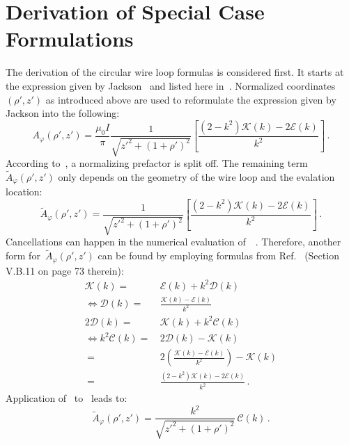 \section{Derivation of Special Case Formulations}
\label{apx:derivation_of_special_case_formulations}
The derivation of the circular wire loop formulas is considered first.
It starts at the expression given by Jackson~\cite{jackson}
and listed here in~.
Normalized coordinates~$(\rho', z')$ as introduced above
are used to reformulate the expression given by Jackson into the following:
\begin{equation}
 A_\varphi(\rho', z')
   = \frac{\mu_0 I}{\pi}
     \frac{1}{\sqrt{z'^2 + (1 + \rho')^2}}
     \left[ \frac{(2 - k^2)\mathcal{K}(k) - 2 \mathcal{E}(k)}{k^2} \right] \, . \label{eqn:cwl_A_phi_initial}
\end{equation}
According to~, a normalizing prefactor is split off.
The remaining term~$\tilde{A}_\varphi(\rho',z')$ only depends on the geometry of the wire loop
and the evalation location:
\begin{equation}
  \tilde{A}_\varphi(\rho', z')
  = \frac{1}{\sqrt{z'^2 + (1 + \rho')^2}}
    \left[ \frac{(2 - k^2)\mathcal{K}(k) - 2 \mathcal{E}(k)}{k^2} \right] \, . \label{eqn:aNormJackson}
\end{equation}
Cancellations can happen in the numerical evaluation of~~\cite{bulirsch_3}.
Therefore, another form for~$\tilde{A}_\varphi(\rho',z')$ can be found by employing
formulas from Ref.~\cite{jahnke_emde} (Section V.B.11 on page 73 therein):
\begin{align}
                 \mathcal{K}(k) =&\, \mathcal{E}(k) + k^2 \mathcal{D}(k) \nonumber \\
 \Leftrightarrow \mathcal{D}(k) =&\, \frac{\mathcal{K}(k) - \mathcal{E}(k)}{k^2} \\
               2 \mathcal{D}(k) =&\, \mathcal{K}(k) + k^2 \mathcal{C}(k) \nonumber \\
 \Leftrightarrow k^2 \mathcal{C}(k) =&\, 2 \mathcal{D}(k) - \mathcal{K}(k) \nonumber \\
                     ~              =&\, 2 \left( \frac{\mathcal{K}(k) - \mathcal{E}(k)}{k^2} \right) - \mathcal{K}(k) \nonumber \\
                     ~              =&\, \frac{(2 - k^2) \mathcal{K}(k) - 2 \mathcal{E}(k)}{k^2} \, . \label{eqn:kSqC}
\end{align}
Application of~ to~ leads to:
\begin{equation}
  \tilde{A}_\varphi(\rho', z')
  = \frac{k^2}{\sqrt{z'^2 + (1 + \rho')^2}} \,\mathcal{C}(k)\, .
\end{equation}
